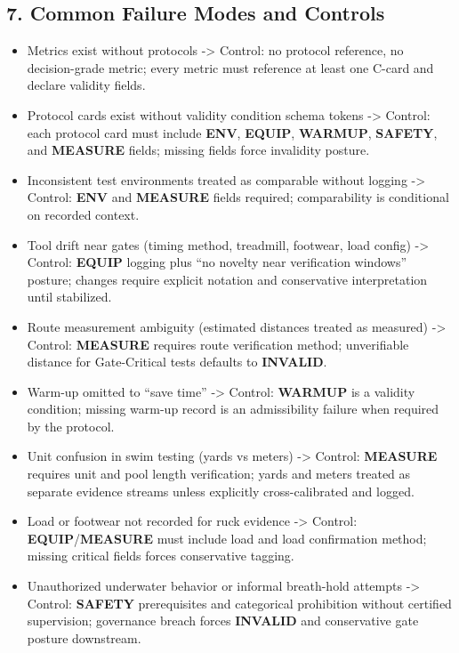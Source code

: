 \documentclass[10pt]{article}
\begin{document}
\subsection*{7. Common Failure Modes and Controls}

\begin{itemize}
\item Metrics exist without protocols -> Control: no protocol reference, no decision-grade metric; every metric must reference at least one C-card and declare validity fields.
\item Protocol cards exist without validity condition schema tokens -> Control: each protocol card must include \textbf{ENV}, \textbf{EQUIP}, \textbf{WARMUP}, \textbf{SAFETY}, and \textbf{MEASURE} fields; missing fields force invalidity posture.
\item Inconsistent test environments treated as comparable without logging -> Control: \textbf{ENV} and \textbf{MEASURE} fields required; comparability is conditional on recorded context.
\item Tool drift near gates (timing method, treadmill, footwear, load config) -> Control: \textbf{EQUIP} logging plus “no novelty near verification windows” posture; changes require explicit notation and conservative interpretation until stabilized.
\item Route measurement ambiguity (estimated distances treated as measured) -> Control: \textbf{MEASURE} requires route verification method; unverifiable distance for Gate-Critical tests defaults to \textbf{INVALID}.
\item Warm-up omitted to “save time” -> Control: \textbf{WARMUP} is a validity condition; missing warm-up record is an admissibility failure when required by the protocol.
\item Unit confusion in swim testing (yards vs meters) -> Control: \textbf{MEASURE} requires unit and pool length verification; yards and meters treated as separate evidence streams unless explicitly cross-calibrated and logged.
\item Load or footwear not recorded for ruck evidence -> Control: \textbf{EQUIP}/\textbf{MEASURE} must include load and load confirmation method; missing critical fields forces conservative tagging.
\item Unauthorized underwater behavior or informal breath-hold attempts -> Control: \textbf{SAFETY} prerequisites and categorical prohibition without certified supervision; governance breach forces \textbf{INVALID} and conservative gate posture downstream.

\end{itemize}
\end{document}
